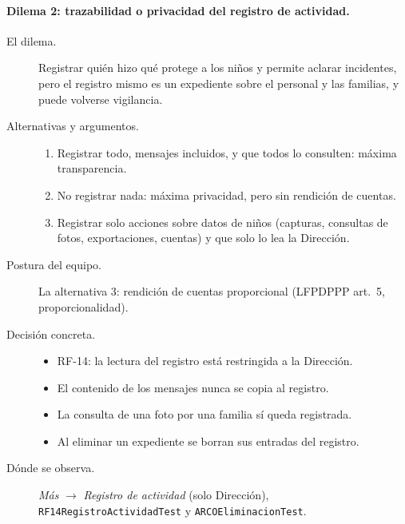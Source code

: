 \paragraph{Dilema 2: trazabilidad o privacidad del registro de actividad.}
\begin{description}
	\item[El dilema.] Registrar quién hizo qué protege a los niños y permite aclarar incidentes, pero el registro mismo es un expediente sobre el personal y las familias, y puede volverse vigilancia.
	\item[Alternativas y argumentos.]
	\begin{enumerate}
		\item Registrar todo, mensajes incluidos, y que todos lo consulten: máxima transparencia.
		\item No registrar nada: máxima privacidad, pero sin rendición de cuentas.
		\item Registrar solo acciones sobre datos de niños (capturas, consultas de fotos, exportaciones, cuentas) y que solo lo lea la Dirección.
	\end{enumerate}
	\item[Postura del equipo.] La alternativa 3: rendición de cuentas proporcional (LFPDPPP art.~5, proporcionalidad).
	\item[Decisión concreta.]
	\begin{itemize}
		\item RF-14: la lectura del registro está restringida a la Dirección.
		\item El contenido de los mensajes nunca se copia al registro.
		\item La consulta de una foto por una familia sí queda registrada.
		\item Al eliminar un expediente se borran sus entradas del registro.
	\end{itemize}
	\item[Dónde se observa.] \emph{Más} $\rightarrow$ \emph{Registro de actividad} (solo Dirección), \texttt{RF14\allowbreak{}Registro\allowbreak{}Actividad\allowbreak{}Test} y \texttt{ARCOEliminacion\allowbreak{}Test}.
\end{description}

